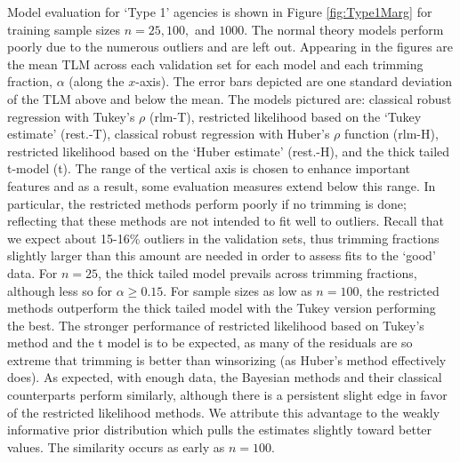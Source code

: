 \documentclass[12pt]{article}
\begin{document}
Model evaluation for `Type 1' agencies is shown in Figure
\ref{fig:Type1Marg} for training sample sizes $n=25, 100,$ and $1000$.
The normal theory models perform poorly due to the numerous outliers
and are left out. Appearing in the figures are the mean TLM across
each validation set for each model and each trimming fraction, $\alpha$ (along the $x$-axis). The error bars depicted are one standard deviation of the TLM above and below the mean. The models pictured are: classical robust regression with Tukey's $\rho$ (rlm-T), restricted likelihood based on the `Tukey estimate' (rest.-T), classical robust regression with Huber's $\rho$ function (rlm-H), restricted likelihood based on the `Huber estimate' (rest.-H), and the thick tailed t-model (t). The range of the vertical axis is chosen to enhance important features and as a result, some evaluation measures extend below this range. In particular, the restricted methods perform poorly if no  trimming is done; reflecting that these methods are not intended to fit well to outliers. Recall that we expect about 15-16\% outliers in the validation sets, thus trimming fractions slightly larger than this amount are needed in order to assess fits to the `good' data. For $n=25$, the thick tailed model  prevails across trimming fractions, although less so for $\alpha\geq 0.15$. For sample sizes as low as $n=100$, the restricted methods outperform the thick tailed model with the Tukey version performing the best.   
The stronger performance of restricted likelihood based on Tukey's method and the t model is to be expected, as many of the 
residuals are so extreme that trimming is better than winsorizing (as Huber's method effectively does).  
As expected, with enough data,  the Bayesian methods and their classical counterparts perform similarly, although there
is a persistent slight edge in favor of the restricted likelihood methods.  We attribute this advantage to the weakly informative
prior distribution which pulls the estimates slightly toward better values.  The similarity occurs as early as $n=100$. 

 
\end{document}
